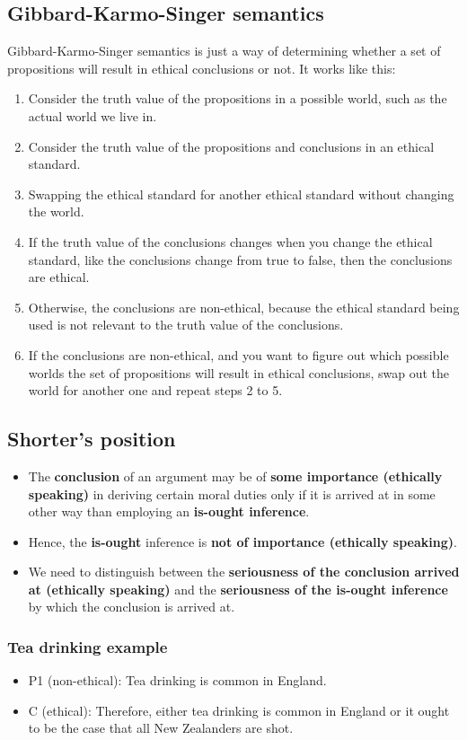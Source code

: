 \documentclass[11pt]{article}
\begin{document}
 \newpage
\subsection{Gibbard-Karmo-Singer semantics}
\label{sec:org25962de}
Gibbard-Karmo-Singer semantics is just a way of determining whether a set of propositions will result in ethical conclusions or not. It works like this:
\begin{enumerate}
\item Consider the truth value of the propositions in a possible world, such as the actual world we live in.
\item Consider the truth value of the propositions and conclusions in an ethical standard.
\item Swapping the ethical standard for another ethical standard without changing the world.
\item If the truth value of the conclusions changes when you change the ethical standard, like the conclusions change from true to false, then the conclusions are ethical.
\item Otherwise, the conclusions are non-ethical, because the ethical standard being used is not relevant to the truth value of the conclusions.
\item If the conclusions are non-ethical, and you want to figure out which possible worlds the set of propositions will result in ethical conclusions, swap out the world for another one and repeat steps 2 to 5.
\end{enumerate}
\subsection{Shorter's position}
\label{sec:orgf733d11}
\begin{itemize}
\item The \textbf{conclusion} of an argument may be of \textbf{some importance (ethically speaking)} in deriving certain moral duties only if it is arrived at in some other way than employing an \textbf{is-ought inference}.
\item Hence, the \textbf{is-ought} inference is \textbf{not of importance (ethically speaking)}.
\item We need to distinguish between the \textbf{seriousness of the conclusion arrived at (ethically speaking)} and the \textbf{seriousness of the is-ought inference} by which the conclusion is arrived at.
\end{itemize}

 \newpage
\subsubsection{Tea drinking example}
\label{sec:orgf29e6cc}
\begin{itemize}
\item P1 (non-ethical): Tea drinking is common in England.
\item C (ethical): Therefore, either tea drinking is common in England or it ought to be the case that all New Zealanders are shot.
\end{itemize}
\end{document}

